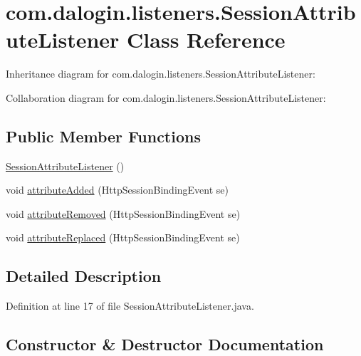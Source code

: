 \hypertarget{classcom_1_1dalogin_1_1listeners_1_1_session_attribute_listener}{}\section{com.\+dalogin.\+listeners.\+Session\+Attribute\+Listener Class Reference}
\label{classcom_1_1dalogin_1_1listeners_1_1_session_attribute_listener}


Inheritance diagram for com.\+dalogin.\+listeners.\+Session\+Attribute\+Listener\+:


Collaboration diagram for com.\+dalogin.\+listeners.\+Session\+Attribute\+Listener\+:
\subsection*{Public Member Functions}
\begin{DoxyCompactItemize}
\item 
\hyperlink{classcom_1_1dalogin_1_1listeners_1_1_session_attribute_listener_a315f0e3a0cb6a6a55c88af8906144d69}{Session\+Attribute\+Listener} ()
\item 
void \hyperlink{classcom_1_1dalogin_1_1listeners_1_1_session_attribute_listener_aa3e6d450cd288bb750c9790450c604b4}{attribute\+Added} (Http\+Session\+Binding\+Event se)
\item 
void \hyperlink{classcom_1_1dalogin_1_1listeners_1_1_session_attribute_listener_abe7a1b3b756fa79527068f51bc4e1443}{attribute\+Removed} (Http\+Session\+Binding\+Event se)
\item 
void \hyperlink{classcom_1_1dalogin_1_1listeners_1_1_session_attribute_listener_aba06d8ea40cebb82681f94342398c90d}{attribute\+Replaced} (Http\+Session\+Binding\+Event se)
\end{DoxyCompactItemize}


\subsection{Detailed Description}


Definition at line 17 of file Session\+Attribute\+Listener.\+java.



\subsection{Constructor \& Destructor Documentation}
\mbox{\label{classcom_1_1dalogin_1_1listeners_1_1_session_attribute_listener_a315f0e3a0cb6a6a55c88af8906144d69}} 
